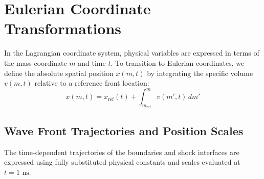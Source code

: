 \documentclass[11pt]{article}
\begin{document}
\section{Eulerian Coordinate Transformations}
In the Lagrangian coordinate system, physical variables are expressed in terms of the mass coordinate $m$ and time $t$. To transition to Eulerian coordinates, we define the absolute spatial position $x(m,t)$ by integrating the specific volume $v(m,t)$ relative to a reference front location:
\begin{equation}
    x(m,t) = x_{\text{ref}}(t) + \int_{m_{\text{ref}}}^{m} v(m',t) \, dm'
\end{equation}

\subsection{Wave Front Trajectories and Position Scales}
The time-dependent trajectories of the boundaries and shock interfaces are expressed using fully substituted physical constants and scales evaluated at $t = 1\text{ ns}$.
\end{document}
